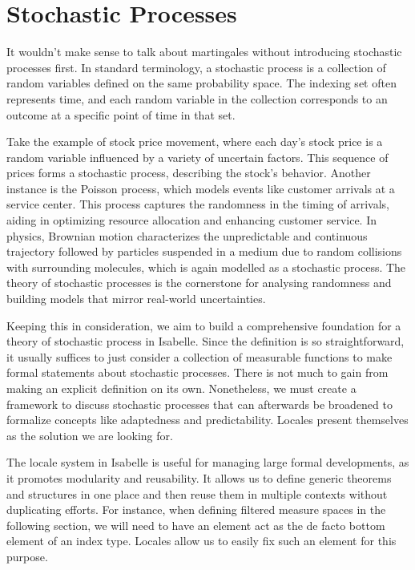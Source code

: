 ﻿%

\chapter{Stochastic Processes}\label{chapter:stochastic_processes}

It wouldn't make sense to talk about martingales without introducing stochastic processes first. In standard terminology, a stochastic process is a collection of random variables defined on the same probability space. The indexing set often represents time, and each random variable in the collection corresponds to an outcome at a specific point of time in that set.

Take the example of stock price movement, where each day's stock price is a random variable influenced by a variety of uncertain factors. This sequence of prices forms a stochastic process, describing the stock's behavior. Another instance is the Poisson process, which models events like customer arrivals at a service center. This process captures the randomness in the timing of arrivals, aiding in optimizing resource allocation and enhancing customer service. In physics, Brownian motion characterizes the unpredictable and continuous trajectory followed by particles suspended in a medium due to random collisions with surrounding molecules, which is again modelled as a stochastic process. The theory of stochastic processes is the cornerstone for analysing randomness and building models that mirror real-world uncertainties.

Keeping this in consideration, we aim to build a comprehensive foundation for a theory of stochastic process in Isabelle. Since the definition is so straightforward, it usually suffices to just consider a collection of measurable functions to make formal statements about stochastic processes. There is not much to gain from making an explicit definition on its own. Nonetheless, we must create a framework to discuss stochastic processes that can afterwards be broadened to formalize concepts like adaptedness and predictability. Locales present themselves as the solution we are looking for.

The locale system in Isabelle is useful for managing large formal developments, as it promotes modularity and reusability. It allows us to define generic theorems and structures in one place and then reuse them in multiple contexts without duplicating efforts. For instance, when defining filtered measure spaces in the following section, we will need to have an element act as the de facto bottom element of an index type. Locales allow us to easily fix such an element for this purpose.

